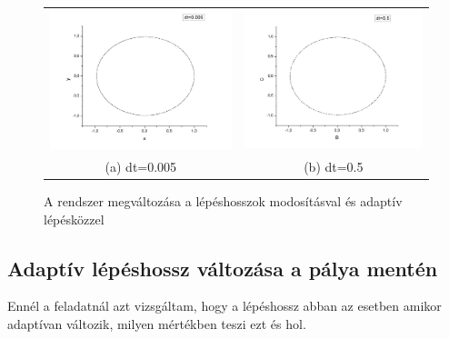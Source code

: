 \documentclass[paper=a4, fontsize=11pt]{article}
\begin{document}
\begin{figure}[H]
\begin{tabular}{cc}
  \includegraphics[width=65mm]{a0005} &   \includegraphics[width=65mm]{a05} \\
(a) dt=0.005 & (b) dt=0.5 
\end{tabular}
\caption{A rendszer megváltozása a lépéshosszok modosításval és adaptív lépésközzel}
\end{figure}


\subsection{Adaptív lépéshossz változása a pálya mentén}
Ennél a feladatnál azt vizsgáltam, hogy a lépéshossz abban az esetben amikor adaptívan változik, milyen mértékben teszi ezt és hol.
\end{document}
